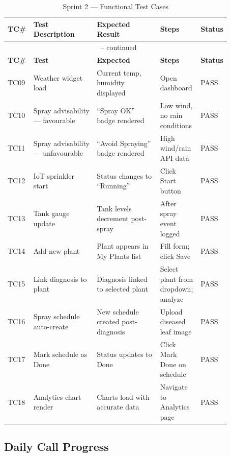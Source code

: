 \documentclass[12pt,a4paper]{report}
\begin{document}
\begin{longtable}{p{0.06\linewidth} p{0.28\linewidth} p{0.28\linewidth} p{0.15\linewidth} p{0.10\linewidth}}
\caption{Sprint 2 — Functional Test Cases} \label{tab:sprint2tc} \\
\toprule
\textbf{TC\#} & \textbf{Test Description} & \textbf{Expected Result} & \textbf{Steps} & \textbf{Status} \\
\midrule
\endfirsthead
\multicolumn{5}{c}{\tablename\ \thetable{} -- continued} \\
\toprule
\textbf{TC\#} & \textbf{Test} & \textbf{Expected} & \textbf{Steps} & \textbf{Status} \\
\midrule
\endhead
TC09  & Weather widget load & Current temp, humidity displayed & Open dashboard & PASS \\
TC10  & Spray advisability — favourable & ``Spray OK'' badge rendered & Low wind, no rain conditions & PASS \\
TC11  & Spray advisability — unfavourable & ``Avoid Spraying'' badge rendered & High wind/rain API data & PASS \\
TC12  & IoT sprinkler start & Status changes to ``Running'' & Click Start button & PASS \\
TC13  & Tank gauge update & Tank levels decrement post-spray & After spray event logged & PASS \\
TC14  & Add new plant & Plant appears in My Plants list & Fill form; click Save & PASS \\
TC15  & Link diagnosis to plant & Diagnosis linked to selected plant & Select plant from dropdown; analyze & PASS \\
TC16  & Spray schedule auto-create & New schedule created post-diagnosis & Upload diseased leaf image & PASS \\
TC17  & Mark schedule as Done & Status updates to Done & Click Mark Done on schedule & PASS \\
TC18  & Analytics chart render & Charts load with accurate data & Navigate to Analytics page & PASS \\
\bottomrule
\end{longtable}

\subsection{Daily Call Progress}
\end{document}
